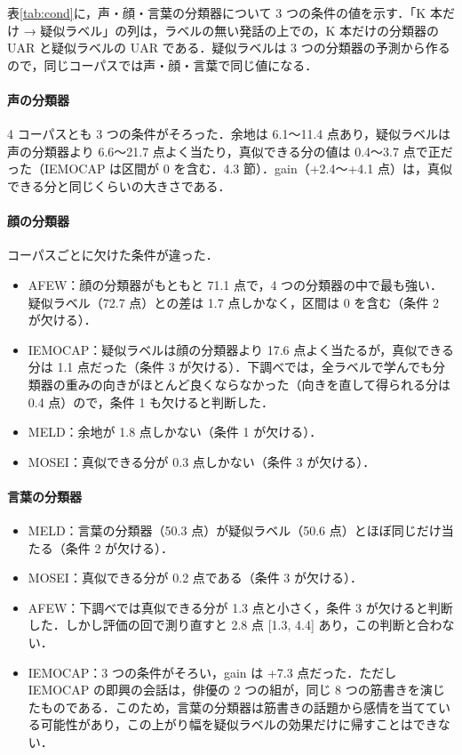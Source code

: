 \documentclass[a4paper,11pt]{ltjsarticle}
\begin{document}
表\ref{tab:cond}に，声・顔・言葉の分類器について 3 つの条件の値を示す．「K 本だけ → 疑似ラベル」の列は，ラベルの無い発話の上での，K 本だけの分類器の UAR と疑似ラベルの UAR である．疑似ラベルは 3 つの分類器の予測から作るので，同じコーパスでは声・顔・言葉で同じ値になる．

\paragraph{声の分類器}
4 コーパスとも 3 つの条件がそろった．余地は 6.1〜11.4 点あり，疑似ラベルは声の分類器より 6.6〜21.7 点よく当たり，真似できる分の値は 0.4〜3.7 点で正だった（IEMOCAP は区間が 0 を含む．4.3 節）．gain（+2.4〜+4.1 点）は，真似できる分と同じくらいの大きさである．

\paragraph{顔の分類器}
コーパスごとに欠けた条件が違った．
\begin{itemize}
  \item AFEW：顔の分類器がもともと 71.1 点で，4 つの分類器の中で最も強い．疑似ラベル（72.7 点）との差は 1.7 点しかなく，区間は 0 を含む（条件 2 が欠ける）．
  \item IEMOCAP：疑似ラベルは顔の分類器より 17.6 点よく当たるが，真似できる分は \textminus{}1.1 点だった（条件 3 が欠ける）．下調べでは，全ラベルで学んでも分類器の重みの向きがほとんど良くならなかった（向きを直して得られる分は 0.4 点）ので，条件 1 も欠けると判断した．
  \item MELD：余地が 1.8 点しかない（条件 1 が欠ける）．
  \item MOSEI：真似できる分が 0.3 点しかない（条件 3 が欠ける）．
\end{itemize}

\paragraph{言葉の分類器}
\begin{itemize}
  \item MELD：言葉の分類器（50.3 点）が疑似ラベル（50.6 点）とほぼ同じだけ当たる（条件 2 が欠ける）．
  \item MOSEI：真似できる分が \textminus{}0.2 点である（条件 3 が欠ける）．
  \item AFEW：下調べでは真似できる分が 1.3 点と小さく，条件 3 が欠けると判断した．しかし評価の回で測り直すと 2.8 点 [1.3, 4.4] あり，この判断と合わない．
  \item IEMOCAP：3 つの条件がそろい，gain は +7.3 点だった．ただし IEMOCAP の即興の会話は，俳優の 2 つの組が，同じ 8 つの筋書きを演じたものである．このため，言葉の分類器は筋書きの話題から感情を当てている可能性があり，この上がり幅を疑似ラベルの効果だけに帰すことはできない．
\end{itemize}
\end{document}
